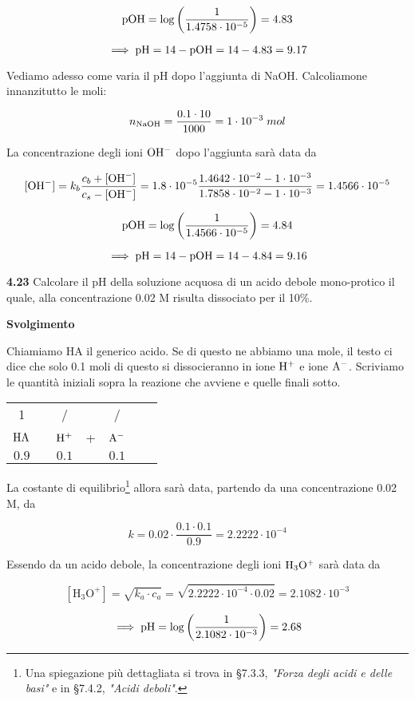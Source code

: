 $$\rm pOH=\log \left( \frac{1}{1.4758 \cdot 10^{-5}} \right)=4.83$$

$$\implies \rm pH=14-pOH=14-4.83=9.17$$

Vediamo adesso come varia il pH dopo l'aggiunta di NaOH. Calcoliamone innanzitutto le moli:

$$n_{\rm NaOH}=\frac{0.1 \cdot 10}{1000}=1 \cdot 10^{-3}\;mol$$

La concentrazione degli ioni $\rm OH^-$ dopo l'aggiunta sarà data da

$${[\text{OH}^-]}=k_b \frac{c_b + {[\text{OH}^-]}}{c_s - \rm{[\text{OH}^-]}}
=1.8 \cdot 10^{-5}\frac{1.4642 \cdot 10^{-2} - 1 \cdot 10^{-3}}{1.7858 \cdot 10^{-2} - 1 \cdot 10^{-3}}=1.4566 \cdot 10^{-5}$$

$$\rm pOH=\log \left( \frac{1}{1.4566 \cdot 10^{-5}} \right)=4.84$$

$$\implies \rm pH=14-pOH=14-4.84=9.16$$

\vspace{0.2cm}\textbf{4.23} Calcolare il pH della soluzione acquosa di un acido debole mono-protico il quale, alla concentrazione 0.02 M risulta dissociato per il 10\%.

\vspace{0.2cm}\large\textbf{Svolgimento}\normalsize

\vspace{0.2cm} Chiamiamo HA il generico acido. Se di questo ne abbiamo una mole, il testo ci dice che solo 0.1 moli di questo si dissocieranno in ione $\rm H^+$ e ione $\rm A^-$. Scriviamo le quantità iniziali sopra la reazione che avviene e quelle finali sotto.

\begin{center}
    \begin{tabular}{ccccccc}
        1 & & / & & /\\
        $\rm HA$ & \ce{<-->} & $\rm H^+$ & + & $\rm A^-$\\
        $0.9$ & & $0.1$ & & $0.1$\\
    \end{tabular}
\end{center}

La costante di equilibrio\footnote{Una spiegazione più dettagliata si trova in §7.3.3, \textit{"Forza degli acidi e delle basi"} e in §7.4.2, \textit{"Acidi deboli"}.} allora sarà data, partendo da una concentrazione 0.02 M, da

$$k=0.02 \cdot \frac{0.1 \cdot 0.1}{0.9}=2.2222 \cdot 10^{-4}$$

Essendo da un acido debole, la concentrazione degli ioni $\rm H_3O^+$ sarà data da

$$[\text{H}_3\text{O}^+] = \sqrt{k_a \cdot c_a}
=\sqrt{2.2222 \cdot 10^{-4} \cdot 0.02}=2.1082 \cdot 10^{-3}$$

$$\implies \rm pH=\log{\left(\frac{1}{2.1082 \cdot 10^{-3}}\right)}=2.68$$